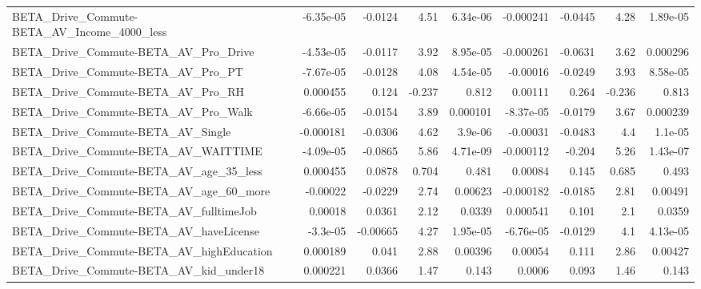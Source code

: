 \begin{tabular}{lrrrrrrrr}
BETA\_Drive\_Commute-BETA\_AV\_Income\_4000\_less        &   -6.35e-05 &      -0.0124 &      4.51 & 6.34e-06 &  -0.000241 &     -0.0445 &         4.28 &      1.89e-05 \\
BETA\_Drive\_Commute-BETA\_AV\_Pro\_Drive               &   -4.53e-05 &      -0.0117 &      3.92 & 8.95e-05 &  -0.000261 &     -0.0631 &         3.62 &      0.000296 \\
BETA\_Drive\_Commute-BETA\_AV\_Pro\_PT                  &   -7.67e-05 &      -0.0128 &      4.08 & 4.54e-05 &   -0.00016 &     -0.0249 &         3.93 &      8.58e-05 \\
BETA\_Drive\_Commute-BETA\_AV\_Pro\_RH                  &    0.000455 &        0.124 &    -0.237 &    0.812 &    0.00111 &       0.264 &       -0.236 &         0.813 \\
BETA\_Drive\_Commute-BETA\_AV\_Pro\_Walk                &   -6.66e-05 &      -0.0154 &      3.89 & 0.000101 &  -8.37e-05 &     -0.0179 &         3.67 &      0.000239 \\
BETA\_Drive\_Commute-BETA\_AV\_Single                  &   -0.000181 &      -0.0306 &      4.62 &  3.9e-06 &   -0.00031 &     -0.0483 &          4.4 &       1.1e-05 \\
BETA\_Drive\_Commute-BETA\_AV\_WAITTIME                &   -4.09e-05 &      -0.0865 &      5.86 & 4.71e-09 &  -0.000112 &      -0.204 &         5.26 &      1.43e-07 \\
BETA\_Drive\_Commute-BETA\_AV\_age\_35\_less             &    0.000455 &       0.0878 &     0.704 &    0.481 &    0.00084 &       0.145 &        0.685 &         0.493 \\
BETA\_Drive\_Commute-BETA\_AV\_age\_60\_more             &    -0.00022 &      -0.0229 &      2.74 &  0.00623 &  -0.000182 &     -0.0185 &         2.81 &       0.00491 \\
BETA\_Drive\_Commute-BETA\_AV\_fulltimeJob             &     0.00018 &       0.0361 &      2.12 &   0.0339 &   0.000541 &       0.101 &          2.1 &        0.0359 \\
BETA\_Drive\_Commute-BETA\_AV\_haveLicense             &    -3.3e-05 &     -0.00665 &      4.27 & 1.95e-05 &  -6.76e-05 &     -0.0129 &          4.1 &      4.13e-05 \\
BETA\_Drive\_Commute-BETA\_AV\_highEducation           &    0.000189 &        0.041 &      2.88 &  0.00396 &    0.00054 &       0.111 &         2.86 &       0.00427 \\
BETA\_Drive\_Commute-BETA\_AV\_kid\_under18             &    0.000221 &       0.0366 &      1.47 &    0.143 &     0.0006 &       0.093 &         1.46 &         0.143 \\

\end{tabular}
